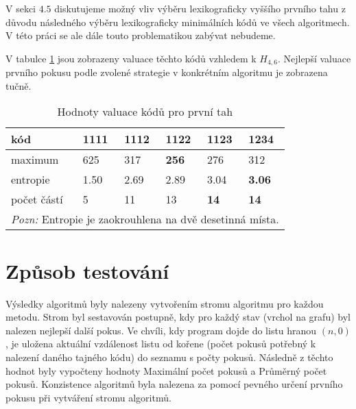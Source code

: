 V sekci $4.5$ diskutujeme možný vliv výběru lexikograficky vyššího prvního tahu z důvodu následného výběru lexikograficky minimálních kódů ve všech algoritmech. V této práci se ale dále touto problematikou zabývat nebudeme. 

V tabulce \ref{tabvaluaceprvnichtahu} jsou zobrazeny valuace těchto kódů vzhledem k $H_{4,6}$. Nejlepší valuace prvního pokusu podle zvolené strategie v konkrétním algoritmu je zobrazena tučně. 


\begin{table}[h]
\centering
\begin{tabular}{l l l l l l}
\toprule
kód & 1111 & 1112 & 1122 & 1123 & 1234 \\
\midrule

maximum & 625 & 317 & \textbf{256} & 276 & 312 \\
entropie & 1.50 & 2.69 & 2.89 & 3.04 & \textbf{3.06}\\




počet částí & 5 & 11 & 13 & \textbf{14} & \textbf{14} \\

\bottomrule
\multicolumn{6}{l}{\footnotesize \textit{Pozn:}
Entropie je zaokrouhlena na dvě desetinná místa.
}

\end{tabular}
\caption{Hodnoty valuace kódů pro první tah}
\label{tabvaluaceprvnichtahu}
\end{table}



\section{Způsob testování}
Výsledky algoritmů byly nalezeny vytvořením stromu algoritmu pro každou metodu. Strom byl sestavován postupně, kdy pro každý stav (vrchol na grafu) byl nalezen nejlepší další pokus. Ve chvíli, kdy program dojde do listu hranou $(n,0)$, je uložena aktuální vzdálenost listu od kořene (počet pokusů potřebný k nalezení daného tajného kódu) do seznamu s počty pokusů. 
Následně z těchto hodnot byly vypočteny hodnoty Maximální počet pokusů a Průměrný počet pokusů. Konzistence algoritmů byla nalezena za pomocí pevného určení prvního pokusu při vytváření stromu algoritmů. 

